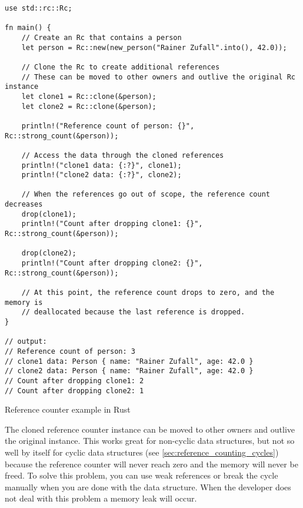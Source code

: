 \begin{listing}
    \begin{verbatim}
use std::rc::Rc;

fn main() {
    // Create an Rc that contains a person
    let person = Rc::new(new_person("Rainer Zufall".into(), 42.0));

    // Clone the Rc to create additional references
    // These can be moved to other owners and outlive the original Rc instance
    let clone1 = Rc::clone(&person);
    let clone2 = Rc::clone(&person);

    println!("Reference count of person: {}", Rc::strong_count(&person));

    // Access the data through the cloned references
    println!("clone1 data: {:?}", clone1);
    println!("clone2 data: {:?}", clone2);

    // When the references go out of scope, the reference count decreases
    drop(clone1);
    println!("Count after dropping clone1: {}", Rc::strong_count(&person));

    drop(clone2);
    println!("Count after dropping clone2: {}", Rc::strong_count(&person));

    // At this point, the reference count drops to zero, and the memory is
    // deallocated because the last reference is dropped.
}

// output:
// Reference count of person: 3
// clone1 data: Person { name: "Rainer Zufall", age: 42.0 }
// clone2 data: Person { name: "Rainer Zufall", age: 42.0 }
// Count after dropping clone1: 2
// Count after dropping clone2: 1
    \end{verbatim}
    \caption{Reference counter example in Rust}
    \label{code:rust_ref_counter_example}
\end{listing}

The cloned reference counter instance can be moved to other owners and outlive the original instance.
This works great for non-cyclic data structures, but not so well by itself for cyclic data structures
(see \autoref{sec:reference_counting_cycles}) because the reference counter will never reach zero
and the memory will never be freed.
To solve this problem, you can use weak references \cite[334-335]{rust_book_2019} or break the cycle manually
when you are done with the data structure.
When the developer does not deal with this problem a memory leak will occur.



